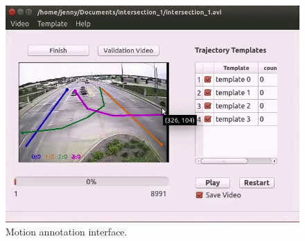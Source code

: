 \begin{figure}
\centering
\includegraphics[width=\linewidth]{./img/system/line_seg.png}
\caption{Motion annotation interface.}
\label{fig:anno-gui}
\end{figure}